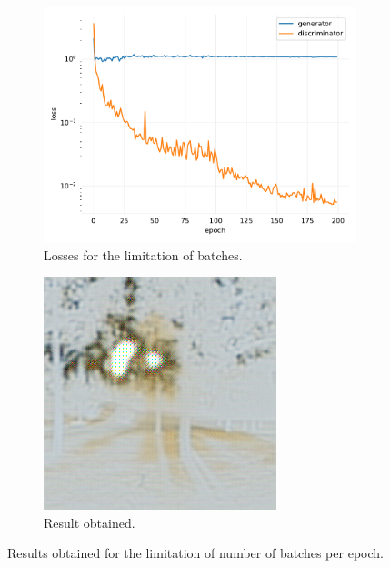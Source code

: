 \documentclass[twocolumn,superscriptaddress,aps,floatfix,nofootinbib]{revtex4-1}
\begin{document}
    \begin{figure}[H]
        \centering
        \begin{subfigure}[b]{0.22\textwidth}
            \centering
            \includegraphics[width=\textwidth]{resources/png/gan-losses/batch-limited.pdf}
            \caption{Losses for the limitation of batches.}
        \end{subfigure}
        \hfill
        \begin{subfigure}[b]{0.22\textwidth}
            \centering
            \includegraphics[width=\textwidth]{resources/png/gan-results/batch-limitation.png}
            \caption{Result obtained.}
            \label{fig:limitation}
        \end{subfigure}
        \caption{Results obtained for the limitation of number of batches per epoch.}
    \end{figure}
    
\end{document}
